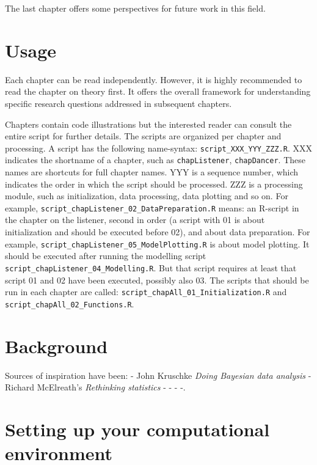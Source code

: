 \documentclass[
]{book}
\theoremstyle{definition}
\theoremstyle{definition}
\theoremstyle{definition}
\theoremstyle{definition}
\theoremstyle{remark}
\begin{document}
The last chapter offers some perspectives for future work in this field.

\hypertarget{usage}{%
\section{Usage}\label{usage}}

Each chapter can be read independently.
However, it is highly recommended to read the chapter on theory first.
It offers the overall framework for understanding specific research questions addressed in subsequent chapters.

Chapters contain code illustrations but the interested reader can consult the entire script for further details. The scripts are organized per chapter and processing.
A script has the following name-syntax: \texttt{script\_XXX\_YYY\_ZZZ.R}.
XXX indicates the shortname of a chapter, such as \texttt{chapListener}, \texttt{chapDancer}. These names are shortcuts for full chapter names.
YYY is a sequence number, which indicates the order in which the script should be processed.
ZZZ is a processing module, such as initialization, data processing, data plotting and so on.
For example, \texttt{script\_chapListener\_02\_DataPreparation.R} means: an R-script in the chapter on the listener, second in order (a script with 01 is about initialization and should be executed before 02), and about data preparation.
For example, \texttt{script\_chapListener\_05\_ModelPlotting.R} is about model plotting. It should be executed after running the modelling script \texttt{script\_chapListener\_04\_Modelling.R}. But that script requires at least that script 01 and 02 have been executed, possibly also 03.
The scripts that should be run in each chapter are called: \texttt{script\_chapAll\_01\_Initialization.R} and \texttt{script\_chapAll\_02\_Functions.R}.

\hypertarget{background}{%
\section{Background}\label{background}}

Sources of inspiration have been:
- John Kruschke \emph{Doing Bayesian data analysis}
- Richard McElreath's \emph{Rethinking statistics}
-
-
-
-.

\hypertarget{setting-up-your-computational-environment}{%
\section{Setting up your computational environment}\label{setting-up-your-computational-environment}}
\end{document}
